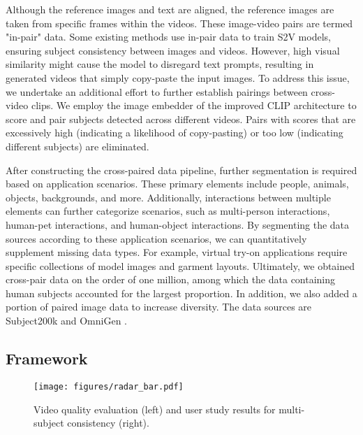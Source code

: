 Although the reference images and text are aligned, the reference images are taken from specific frames within the videos. These image-video pairs are termed "in-pair" data. Some existing methods \cite{chen2025multi,huang2025conceptmaster} use in-pair data to train S2V models, ensuring subject consistency between images and videos. However, high visual similarity might cause the model to disregard text prompts, resulting in generated videos that simply copy-paste the input images. To address this issue, we undertake an additional effort to further establish pairings between cross-video clips. We employ the image embedder \cite{shao20221st} of the improved CLIP architecture to score and pair subjects detected across different videos. Pairs with scores that are excessively high (indicating a likelihood of copy-pasting) or too low (indicating different subjects) are eliminated.  

After constructing the cross-paired data pipeline, further segmentation is required based on application scenarios. 
These primary elements include people, animals, objects, backgrounds, and more. Additionally, interactions between multiple elements can further categorize scenarios, such as multi-person interactions, human-pet interactions, and human-object interactions. 
By segmenting the data sources according to these application scenarios, we can quantitatively supplement missing data types. For example, virtual try-on applications require specific collections of model images and garment layouts. 
Ultimately, we obtained cross-pair data on the order of one million, among which the data containing human subjects accounted for the largest proportion. In addition, we also added a portion of paired image data to increase diversity. The data sources are Subject200k \cite{chen2024unireal} and OmniGen \cite{xiao2024omnigen}.

\subsection{Framework}
\label{sec:method:framework}

\begin{figure*}[t]
	\centering
	\texttt{[image: figures/radar\_bar.pdf]} 
	\caption{Video quality evaluation (left) and user study results for multi-subject consistency (right).}
	\label{fig:radar}
\end{figure*}

